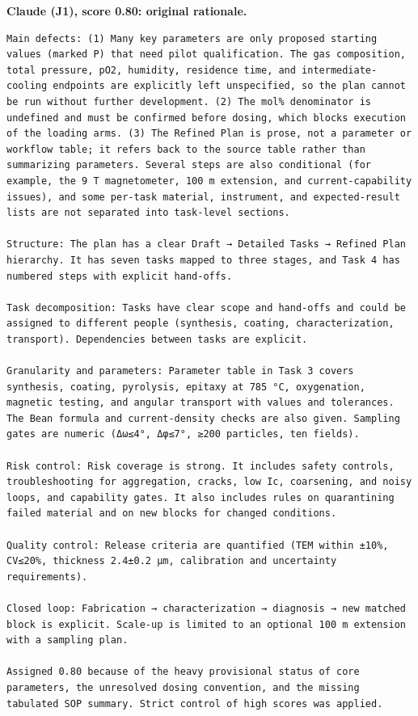 \noindent\textbf{Claude (J1), score 0.80: original rationale.}
\begin{lstlisting}[style=jsonstyle,basicstyle=\fontsize{8}{9.6}\selectfont\ttfamily,backgroundcolor=\color{white}]
Main defects: (1) Many key parameters are only proposed starting values (marked P) that need pilot qualification. The gas composition, total pressure, pO2, humidity, residence time, and intermediate-cooling endpoints are explicitly left unspecified, so the plan cannot be run without further development. (2) The mol% denominator is undefined and must be confirmed before dosing, which blocks execution of the loading arms. (3) The Refined Plan is prose, not a parameter or workflow table; it refers back to the source table rather than summarizing parameters. Several steps are also conditional (for example, the 9 T magnetometer, 100 m extension, and current-capability issues), and some per-task material, instrument, and expected-result lists are not separated into task-level sections.

Structure: The plan has a clear Draft → Detailed Tasks → Refined Plan hierarchy. It has seven tasks mapped to three stages, and Task 4 has numbered steps with explicit hand-offs.

Task decomposition: Tasks have clear scope and hand-offs and could be assigned to different people (synthesis, coating, characterization, transport). Dependencies between tasks are explicit.

Granularity and parameters: Parameter table in Task 3 covers synthesis, coating, pyrolysis, epitaxy at 785 °C, oxygenation, magnetic testing, and angular transport with values and tolerances. The Bean formula and current-density checks are also given. Sampling gates are numeric (Δω≤4°, Δφ≤7°, ≥200 particles, ten fields).

Risk control: Risk coverage is strong. It includes safety controls, troubleshooting for aggregation, cracks, low Ic, coarsening, and noisy loops, and capability gates. It also includes rules on quarantining failed material and on new blocks for changed conditions.

Quality control: Release criteria are quantified (TEM within ±10%, CV≤20%, thickness 2.4±0.2 µm, calibration and uncertainty requirements).

Closed loop: Fabrication → characterization → diagnosis → new matched block is explicit. Scale-up is limited to an optional 100 m extension with a sampling plan.

Assigned 0.80 because of the heavy provisional status of core parameters, the unresolved dosing convention, and the missing tabulated SOP summary. Strict control of high scores was applied.
\end{lstlisting}

